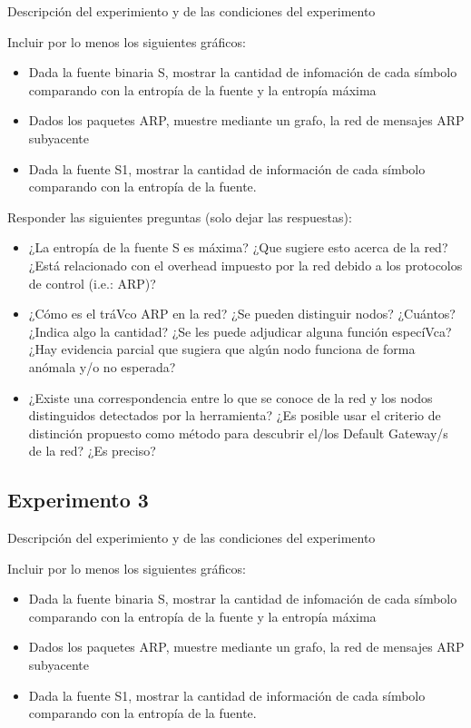 Descripci\'on del experimiento y de las condiciones del experimento

Incluir por lo menos los siguientes gr\'aficos:

\begin{itemize}
	\item Dada la fuente binaria S, mostrar la cantidad de infomación de cada símbolo comparando con la entropía de la fuente y la entropía máxima
	\item Dados los paquetes ARP, muestre mediante un grafo, la red de mensajes ARP subyacente
	\item Dada la fuente S1, mostrar la cantidad de información de cada símbolo comparando con la entropía de la fuente.
\end{itemize}

Responder las siguientes preguntas (solo dejar las respuestas):

\begin{itemize}
	\item ¿La entropía de la fuente S es máxima? ¿Que sugiere esto acerca de la red? ¿Está relacionado con el overhead impuesto por la red debido a los protocolos de control (i.e.: ARP)?
	\item ¿Cómo es el tráVco ARP en la red? ¿Se pueden distinguir nodos? ¿Cuántos? ¿Indica algo la cantidad? ¿Se les puede adjudicar alguna función especíVca? ¿Hay evidencia parcial que sugiera que algún nodo funciona de forma anómala y/o no esperada?
	\item ¿Existe una correspondencia entre lo que se conoce de la red y los nodos distinguidos detectados por la herramienta? ¿Es posible usar el criterio de distinción propuesto como método para descubrir el/los Default Gateway/s de la red? ¿Es preciso?
\end{itemize}


\subsection{Experimento 3}

Descripci\'on del experimiento y de las condiciones del experimento

Incluir por lo menos los siguientes gr\'aficos:

\begin{itemize}
	\item Dada la fuente binaria S, mostrar la cantidad de infomación de cada símbolo comparando con la entropía de la fuente y la entropía máxima
	\item Dados los paquetes ARP, muestre mediante un grafo, la red de mensajes ARP subyacente
	\item Dada la fuente S1, mostrar la cantidad de información de cada símbolo comparando con la entropía de la fuente.
\end{itemize}


